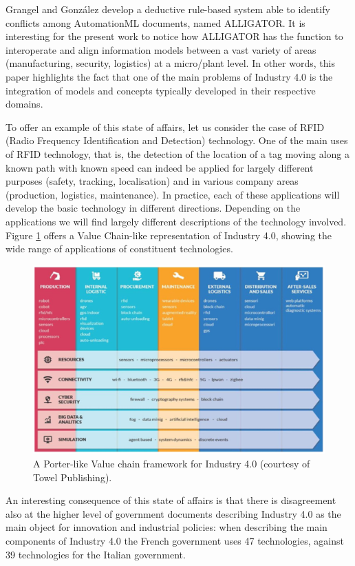 \documentclass[b5paper,]{book}
\theoremstyle{definition}
\theoremstyle{definition}
\theoremstyle{definition}
\theoremstyle{remark}
\begin{document}
Grangel and González \citep{grangel2016towards} develop a deductive
rule-based system able to identify conflicts among AutomationML
documents, named ALLIGATOR. It is interesting for the present work to
notice how ALLIGATOR has the function to interoperate and align
information models between a vast variety of areas (manufacturing,
security, logistics) at a micro/plant level. In other words, this paper
highlights the fact that one of the main problems of Industry 4.0 is the
integration of models and concepts typically developed in their
respective domains.

To offer an example of this state of affairs, let us consider the case
of RFID (Radio Frequency Identification and Detection) technology. One
of the main uses of RFID technology, that is, the detection of the
location of a tag moving along a known path with known speed can indeed
be applied for largely different purposes (safety, tracking,
localisation) and in various company areas (production, logistics,
maintenance). In practice, each of these applications will develop the
basic technology in different directions. Depending on the applications
we will find largely different descriptions of the technology involved.
Figure \ref{fig:techvaluechain40} offers a Value Chain-like
representation of Industry 4.0, showing the wide range of applications
of constituent technologies.

\begin{figure}

{\centering \includegraphics[width=0.7\linewidth]{_bookdown_files/figures/techvaluechain40} 

}

\caption{A Porter-like Value chain framework for Industry 4.0 (courtesy of Towel Publishing).}\label{fig:techvaluechain40}
\end{figure}

An interesting consequence of this state of affairs is that there is
disagreement also at the higher level of government documents describing
Industry 4.0 as the main object for innovation and industrial policies:
when describing the main components of Industry 4.0 the French
government uses 47 technologies, against 39 technologies for the Italian
government.
\end{document}
